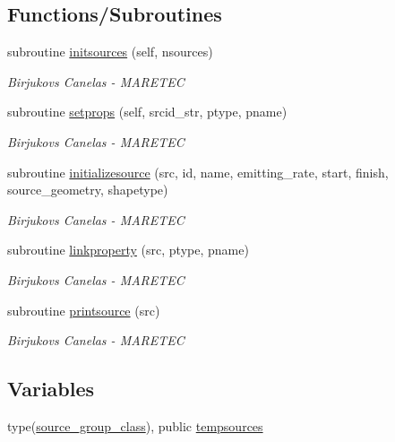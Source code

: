 \subsection*{Functions/\+Subroutines}
\begin{DoxyCompactItemize}
\item 
subroutine \hyperlink{namespacesources__mod_a6da3303e5c39d77c0111ec50623bf5fe}{initsources} (self, nsources)
\begin{DoxyCompactList}\small\item\em Birjukovs Canelas -\/ M\+A\+R\+E\+T\+EC \end{DoxyCompactList}\item 
subroutine \hyperlink{namespacesources__mod_aa02996b7219ce9c9d26439e8d2d0a468}{setprops} (self, srcid\+\_\+str, ptype, pname)
\begin{DoxyCompactList}\small\item\em Birjukovs Canelas -\/ M\+A\+R\+E\+T\+EC \end{DoxyCompactList}\item 
subroutine \hyperlink{namespacesources__mod_a6dcf7a3e3ccf75e01853df166231d484}{initializesource} (src, id, name, emitting\+\_\+rate, start, finish, source\+\_\+geometry, shapetype)
\begin{DoxyCompactList}\small\item\em Birjukovs Canelas -\/ M\+A\+R\+E\+T\+EC \end{DoxyCompactList}\item 
subroutine \hyperlink{namespacesources__mod_a683ca7e4aca7a0050aad9f506569fca9}{linkproperty} (src, ptype, pname)
\begin{DoxyCompactList}\small\item\em Birjukovs Canelas -\/ M\+A\+R\+E\+T\+EC \end{DoxyCompactList}\item 
subroutine \hyperlink{namespacesources__mod_a641fe9ecc295e486a714c1aaa133d991}{printsource} (src)
\begin{DoxyCompactList}\small\item\em Birjukovs Canelas -\/ M\+A\+R\+E\+T\+EC \end{DoxyCompactList}\end{DoxyCompactItemize}
\subsection*{Variables}
\begin{DoxyCompactItemize}
\item 
type(\hyperlink{structsources__mod_1_1source__group__class}{source\+\_\+group\+\_\+class}), public \hyperlink{namespacesources__mod_ab04ea8c02cdf83a1a356c8710ae811d5}{tempsources}
\end{DoxyCompactItemize}


